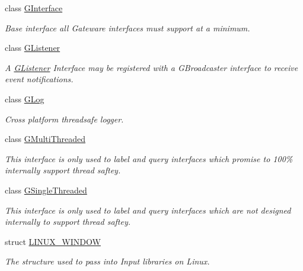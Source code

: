 \begin{DoxyCompactItemize}
class \hyperlink{class_g_w_1_1_c_o_r_e_1_1_g_interface}{G\+Interface}
\begin{DoxyCompactList}\small\item\em Base interface all Gateware interfaces must support at a minimum. \end{DoxyCompactList}\item 
class \hyperlink{class_g_w_1_1_c_o_r_e_1_1_g_listener}{G\+Listener}
\begin{DoxyCompactList}\small\item\em A \hyperlink{class_g_w_1_1_c_o_r_e_1_1_g_listener}{G\+Listener} Interface may be registered with a G\+Broadcaster interface to receive event notifications. \end{DoxyCompactList}\item 
class \hyperlink{class_g_w_1_1_c_o_r_e_1_1_g_log}{G\+Log}
\begin{DoxyCompactList}\small\item\em Cross platform threadsafe logger. \end{DoxyCompactList}\item 
class \hyperlink{class_g_w_1_1_c_o_r_e_1_1_g_multi_threaded}{G\+Multi\+Threaded}
\begin{DoxyCompactList}\small\item\em This interface is only used to label and query interfaces which promise to 100\% internally support thread saftey. \end{DoxyCompactList}\item 
class \hyperlink{class_g_w_1_1_c_o_r_e_1_1_g_single_threaded}{G\+Single\+Threaded}
\begin{DoxyCompactList}\small\item\em This interface is only used to label and query interfaces which are not designed internally to support thread saftey. \end{DoxyCompactList}\item 
struct \hyperlink{struct_g_w_1_1_c_o_r_e_1_1_l_i_n_u_x___w_i_n_d_o_w}{L\+I\+N\+U\+X\+\_\+\+W\+I\+N\+D\+OW}
\begin{DoxyCompactList}\small\item\em The structure used to pass into Input libraries on Linux. \end{DoxyCompactList}\end{DoxyCompactItemize}
